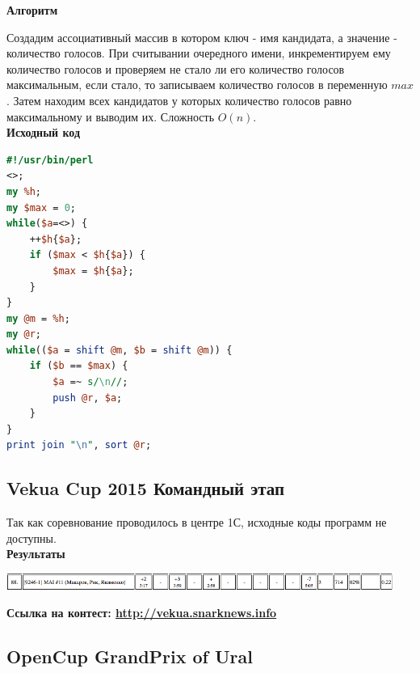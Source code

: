 \documentclass[a4paper,12pt]{article}
\begin{document}
\newpage
\textbf{{\large Алгоритм}}

Создадим ассоциативный массив в котором ключ - имя кандидата, а значение - количество голосов. При считывании очередного имени, инкрементируем ему количество голосов и проверяем не стало ли его количество голосов максимальным, если стало, то записываем количество голосов в переменную $max$. Затем находим всех кандидатов у которых количество голосов равно максимальному и выводим их. Сложность $O(n)$.\\

\textbf{{\large Исходный код}} \\
\begin{lstlisting}[language=Perl]
#!/usr/bin/perl
<>;
my %h;
my $max = 0;
while($a=<>) {
	++$h{$a};
	if ($max < $h{$a}) {
		$max = $h{$a};
	}
}
my @m = %h;
my @r;
while(($a = shift @m, $b = shift @m)) {
	if ($b == $max) {
		$a =~ s/\n//;
		push @r, $a;
	}
}
print join "\n", sort @r;
\end{lstlisting}




%
%
\newpage
\subsection{Vekua Cup 2015 Командный этап}

Так как соревнование проводилось в центре 1С, исходные коды программ не доступны. \\

\textbf{{\large Результаты}} \\
\begin{center}
\includegraphics[width=0.95\textwidth]{Vekua_team/Vekua_team_result.png}\\ [1cm]
\end{center}

\textbf{{\large Ссылка на контест: \url{http://vekua.snarknews.info}}}



%
%
\newpage
\subsection{OpenCup GrandPrix of Ural}
\end{document}
